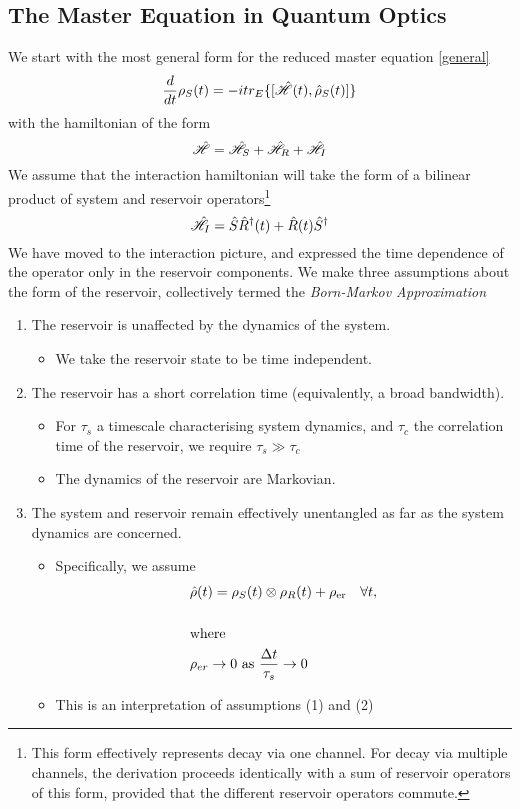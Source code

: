 \subsection{The Master Equation in Quantum Optics}
\label{microscopic}
We start with the most general form for the reduced master equation \cref{general}
\begin{equation}
	\frac{d}{dt} \rho_S (t) = -itr_E\{[\hat{\mathscr{H}}(t), \hat{\rho}_S(t)]\}
\end{equation}
with the hamiltonian of the form 
\begin{equation}
  \hat{\mathscr{H}} = \hat{\mathscr{H}}_S + \hat{\mathscr{H}}_R + \hat{\mathscr{H}}_{I}
\end{equation}
We assume that the interaction hamiltonian will take the form of a bilinear product of system and reservoir operators\footnote{This form effectively represents decay via one channel. For decay via multiple channels, the derivation proceeds identically with a sum of reservoir operators of this form, provided that the different reservoir operators commute.}
\begin{equation}
  \hat{\mathscr{H}}_{I} = \hat{S}\hat{R}^\dagger (t)+ \hat{R}(t)\hat{S}^\dagger
\end{equation}
We have moved to the interaction picture, and expressed the time dependence of the operator only in the reservoir components.
We make three assumptions about the form of the reservoir, collectively termed the \emph{Born-Markov Approximation}
\begin{enumerate}
  \item The reservoir is unaffected by the dynamics of the system.
    \begin{itemize}
      \item We take the reservoir state to be time independent.
    \end{itemize}
  \item The reservoir has a short correlation time (equivalently, a broad bandwidth).
    \begin{itemize}
      \item For $\tau_s$ a timescale characterising system dynamics, and $\tau_c$ the correlation time of the reservoir, we require $\tau_s \gg \tau_c$
      \item The dynamics of the reservoir are Markovian.
    \end{itemize}
  \item The system and reservoir remain effectively unentangled as far as the system dynamics are concerned.
    \begin{itemize}
      \item Specifically, we assume 
        \begin{align*}
          &\hat{\rho}(t) = \rho_S(t)  \otimes \rho_R(t) + \rho_{\text{er}}\quad \forall t,\\
          &\\
          &\text{where}\\
          &\rho_{er} \rightarrow 0 \text{ as } \frac{\Delta t}{\tau_s} \rightarrow 0
        \end{align*}
      \item This is an interpretation of assumptions (1) and (2)
    \end{itemize}
\end{enumerate}
